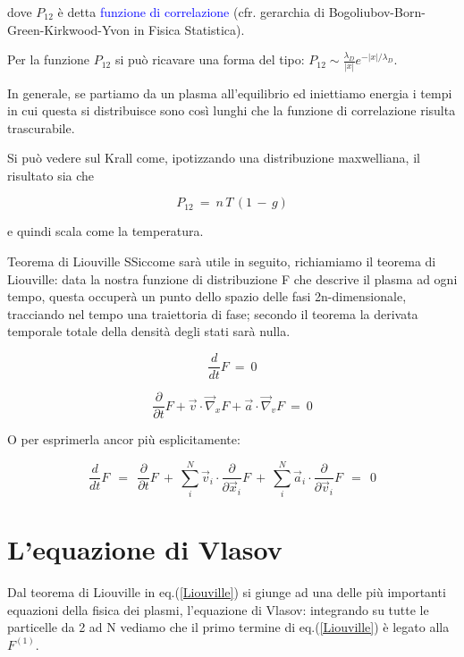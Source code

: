 dove \textbf{$P_{12}$} è detta \textcolor{blue}{funzione di correlazione} (cfr. gerarchia di Bogoliubov-Born-Green-Kirkwood-Yvon in Fisica Statistica). 

Per la funzione $P_{12}$ si può ricavare una forma del tipo: $P_{12}\sim \frac{\lambda_D}{|x|} e^{-|x|/\lambda_D}$.

In generale, se partiamo da un plasma all'equilibrio ed iniettiamo energia i tempi in cui questa si distribuisce sono così lunghi che la funzione di correlazione risulta trascurabile.

Si può vedere sul Krall come, ipotizzando una distribuzione maxwelliana, il risultato sia che

\[P_{12}\ =\ n\, T\,(1\,-\,g)\]

e quindi scala come la temperatura.

\begin{teorema}{Teorema di Liouville}
	 SSiccome sarà utile in seguito, richiamiamo il teorema di Liouville: data la nostra funzione di distribuzione F che descrive il plasma ad ogni tempo, questa occuperà un punto dello spazio delle fasi 2n-dimensionale, tracciando nel tempo una traiettoria di fase; secondo il teorema la derivata temporale totale della densità degli stati sarà nulla.
	
	\[ \frac{d}{dt} F\ =\ 0\]
	
	\[ \frac{\partial}{\partial t} F + \vec v \cdot \vec\nabla_x F + \vec a \cdot \vec\nabla_v F\ =\ 0\]
	
	O per esprimerla ancor più esplicitamente:
	
	\begin{equation}\label{Liouville}
		\frac{d}{dt} F\ \ =\ \ \frac{\partial}{\partial t} F\ +\ \sum_i^N\vec v_i \cdot  \frac{\partial}{\partial \vec x_i}F \ +\ \sum_i^N\vec a_i \cdot  \frac{\partial}{\partial \vec v_i}F\ \ =\ \ 0
	\end{equation}
	
\end{teorema}

%
%
%
\vspace{0.5cm}
\section{L'equazione di Vlasov}

Dal teorema di Liouville in eq.(\ref{Liouville}) si giunge ad una delle più importanti equazioni della fisica dei plasmi, l'equazione di Vlasov: integrando su tutte le particelle da 2 ad N vediamo che il primo termine di eq.(\ref{Liouville}) è legato alla $F^{(1)}$.

